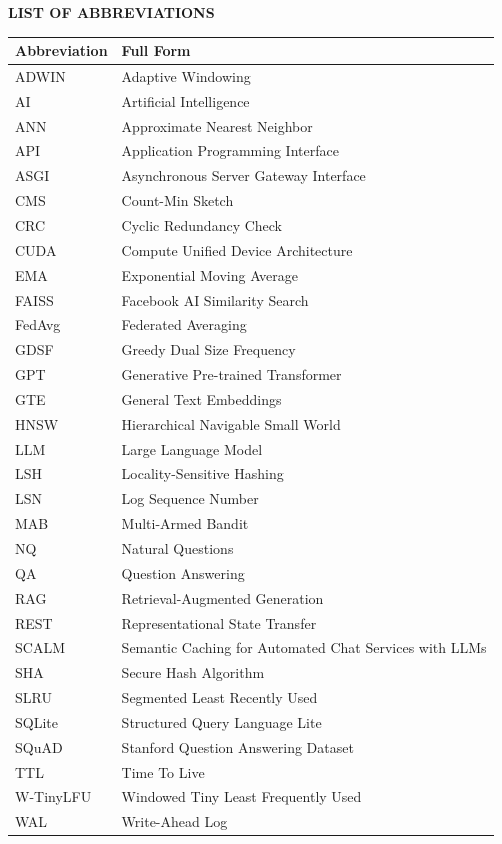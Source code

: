 \documentclass[12pt,a4paper]{report}
\begin{document}
\newpage
\begin{center}
{\fontsize{14}{17}\selectfont\bfseries LIST OF ABBREVIATIONS}
\end{center}
\vspace{0.5cm}

\begin{longtable}{p{4cm} p{10cm}}
\toprule
\textbf{Abbreviation} & \textbf{Full Form} \\
\midrule
\endhead
ADWIN & Adaptive Windowing \\
AI & Artificial Intelligence \\
ANN & Approximate Nearest Neighbor \\
API & Application Programming Interface \\
ASGI & Asynchronous Server Gateway Interface \\
CMS & Count-Min Sketch \\
CRC & Cyclic Redundancy Check \\
CUDA & Compute Unified Device Architecture \\
EMA & Exponential Moving Average \\
FAISS & Facebook AI Similarity Search \\
FedAvg & Federated Averaging \\
GDSF & Greedy Dual Size Frequency \\
GPT & Generative Pre-trained Transformer \\
GTE & General Text Embeddings \\
HNSW & Hierarchical Navigable Small World \\
LLM & Large Language Model \\
LSH & Locality-Sensitive Hashing \\
LSN & Log Sequence Number \\
MAB & Multi-Armed Bandit \\
NQ & Natural Questions \\
QA & Question Answering \\
RAG & Retrieval-Augmented Generation \\
REST & Representational State Transfer \\
SCALM & Semantic Caching for Automated Chat Services with LLMs \\
SHA & Secure Hash Algorithm \\
SLRU & Segmented Least Recently Used \\
SQLite & Structured Query Language Lite \\
SQuAD & Stanford Question Answering Dataset \\
TTL & Time To Live \\
W-TinyLFU & Windowed Tiny Least Frequently Used \\
WAL & Write-Ahead Log \\
\bottomrule
\end{longtable}
\end{document}
